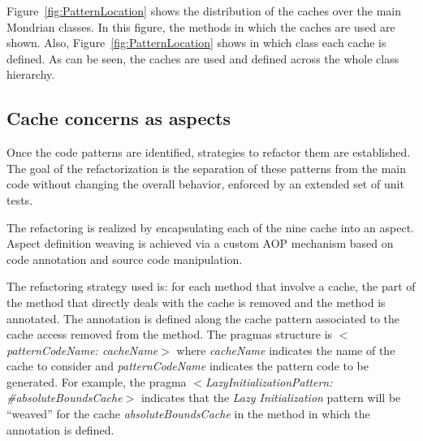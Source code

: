 \documentclass[preprint,10pt]{sigplanconf}
\newcommand{\figref}[1]{Figure~\ref{fig:#1}\xspace}
\begin{document}

\figref{PatternLocation} shows the distribution of the caches over the main Mondrian classes. In this figure, the methods in which the caches are used are shown. Also, \figref{PatternLocation} shows in which class each cache is defined. As can be seen, the caches are used and defined across the whole class hierarchy.

\subsection{Cache concerns as aspects}

Once the code patterns are identified, strategies to refactor them
are established. The goal of the refactorization is the separation of these patterns from the main code without changing the overall behavior, enforced by an extended set of unit tests.

The refactoring is realized by encapsulating each of the nine cache into an aspect. Aspect definition weaving is achieved via a custom AOP mechanism based on code annotation and source code manipulation. 


The refactoring strategy used is: for each method that involve a cache, the part of the method that directly deals with the cache is removed and the method is annotated.
The annotation is defined along the cache pattern associated to the cache access removed from the method.
The pragmas structure is \emph{$<$patternCodeName: cacheName$>$} where \emph{cacheName} indicates the name of the cache to consider and \emph{patternCodeName} indicates the pattern code to be generated. For example, the pragma \emph{$<$LazyInitializationPattern: \#absoluteBoundsCache$>$} indicates that the \emph{Lazy Initialization} pattern will be ``weaved'' for the cache \emph{absoluteBoundsCache} in the method in which the annotation is defined.
\end{document}
